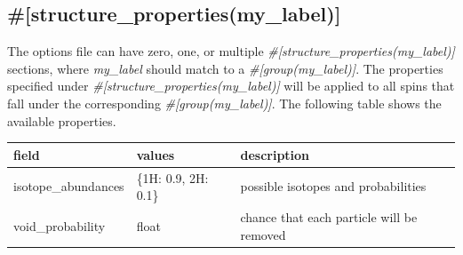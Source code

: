 \documentclass{book}
\begin{document}
\subsection{\#[structure\_properties(my\_label)]}
The options file can have zero, one, or multiple 
\textit{\#[structure\_properties(my\_label)]} sections,
where \textit{my\_label} should match to a 
\textit{\#[group(my\_label)]}.
The properties specified under  
\textit{\#[structure\_properties(my\_label)]} will be applied
to all spins that fall under the corresponding
\textit{\#[group(my\_label)]}.
The following table shows the available properties.
\begin{center}
\begin{tabular}{| m{20em} | m{1.5cm}| m{7cm} |}
 \hline 
 \textbf{field} & \textbf{values} & \textbf{description} \\ 
 \hline 
 isotope\_abundances & \{1H: 0.9, 2H: 0.1\} & possible isotopes and
 probabilities\\
 \hline 
 void\_probability & float & chance that each particle will be removed\\
 \hline 
\end{tabular}
\end{center} 

\end{document}
